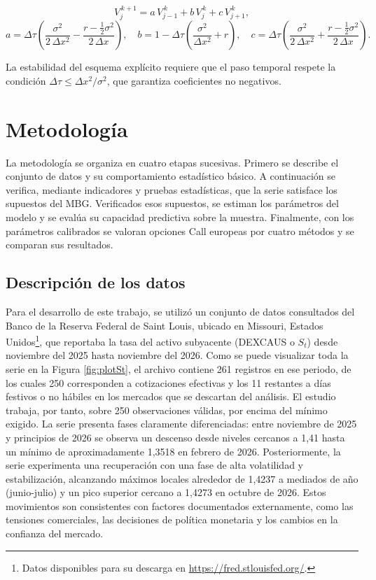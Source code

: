 \documentclass{article}
\begin{document}
\begin{equation}
V_{j}^{\,k+1}=a\,V_{j-1}^{\,k}+b\,V_{j}^{\,k}+c\,V_{j+1}^{\,k},
\label{eq:fd_esquema}
\end{equation}
\begin{equation}
a=\Delta\tau\!\left(\frac{\sigma^2}{2\,\Delta x^2}-\frac{r-\tfrac12\sigma^2}{2\,\Delta x}\right),\quad
b=1-\Delta\tau\!\left(\frac{\sigma^2}{\Delta x^2}+r\right),\quad
c=\Delta\tau\!\left(\frac{\sigma^2}{2\,\Delta x^2}+\frac{r-\tfrac12\sigma^2}{2\,\Delta x}\right).
\label{eq:fd_coef}
\end{equation}

La estabilidad del esquema explícito requiere que el paso temporal respete la condición $\Delta\tau\le \Delta x^2/\sigma^2$, que garantiza coeficientes no negativos.

\section*{Metodología}
La metodología se organiza en cuatro etapas sucesivas. Primero se describe el conjunto de datos y su comportamiento estadístico básico. A continuación se verifica, mediante indicadores y pruebas estadísticas, que la serie satisface los supuestos del MBG. Verificados esos supuestos, se estiman los parámetros del modelo y se evalúa su capacidad predictiva sobre la muestra. Finalmente, con los parámetros calibrados se valoran opciones Call europeas por cuatro métodos y se comparan sus resultados.

\subsection*{Descripción de los datos}
Para el desarrollo de este trabajo, se utilizó un conjunto de datos consultados del Banco de la Reserva Federal de Saint Louis, ubicado en Missouri, Estados Unidos\footnote{Datos disponibles para su descarga en \url{https://fred.stlouisfed.org/}.}, que reportaba la tasa del activo subyacente (DEXCAUS o \(S_t\)) desde noviembre del 2025 hasta noviembre del 2026. Como se puede visualizar toda la serie en la Figura \ref{fig:plotSt}, el archivo contiene 261 registros en ese periodo, de los cuales 250 corresponden a cotizaciones efectivas y los 11 restantes a días festivos o no hábiles en los mercados que se descartan del análisis. El estudio trabaja, por tanto, sobre 250 observaciones válidas, por encima del mínimo exigido. La serie presenta fases claramente diferenciadas: entre noviembre de 2025 y principios de 2026 se observa un descenso desde niveles cercanos a 1,41 hasta un mínimo de aproximadamente 1,3518 en febrero de 2026. Posteriormente, la serie experimenta una recuperación con una fase de alta volatilidad y estabilización, alcanzando máximos locales alrededor de 1,4237 a mediados de año (junio-julio) y un pico superior cercano a 1,4273 en octubre de 2026. Estos movimientos son consistentes con factores documentados externamente, como las tensiones comerciales, las decisiones de política monetaria y los cambios en la confianza del mercado.
\end{document}
